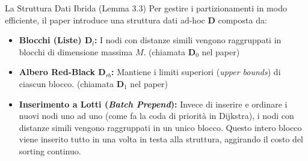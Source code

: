 \documentclass[aspectratio=169]{beamer}
\begin{document}
\begin{frame}{La Struttura Dati Ibrida (Lemma 3.3)}
    Per gestire i partizionamenti in modo efficiente, il paper introduce una struttura dati ad-hoc $\mathbf{D}$ composta da:
    \vspace{0.3cm}
    
    \begin{itemize}
        \item \textbf{Blocchi (Liste) $\mathbf{D}_l$: } I nodi con distanze simili vengono raggruppati in blocchi di dimensione massima $M$. (chiamata $\mathbf{D}_{0}$ nel paper)
        \item \textbf{Albero Red-Black $\mathbf{D}_{rb}$: } Mantiene i limiti superiori (\textit{upper bounds}) di ciascun blocco. (chiamata $\mathbf{D}_{1}$ nel paper)
        \item \textbf{Inserimento a Lotti (\textit{Batch Prepend}):} Invece di inserire e ordinare i nuovi nodi uno ad uno (come fa la coda di priorità in Dijkstra), i nodi con distanze simili vengono raggruppati in un unico blocco. Questo intero blocco viene inserito tutto in una volta in testa alla struttura, aggirando il costo del sorting continuo.
    \end{itemize}
\end{frame}
\end{document}
